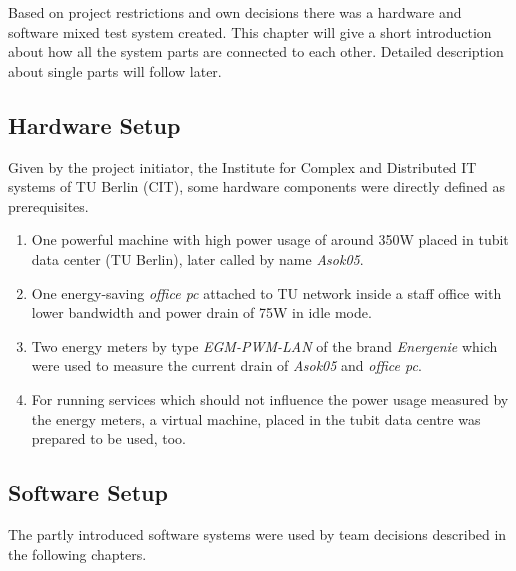 Based on project restrictions and own decisions there was a hardware and software mixed test system created. This chapter will give a short introduction about how all the system parts are connected to each other. Detailed description about single parts will follow later.

\subsection{Hardware Setup}

Given by the project initiator, the Institute for Complex and Distributed IT systems of TU Berlin (CIT), some hardware components were directly defined as prerequisites.

\begin{enumerate}

\item One powerful machine with high power usage of around 350W placed in tubit data center (TU Berlin), later called by name \textit{Asok05}.

\item One energy-saving \textit{office pc} attached to TU network inside a staff office with lower bandwidth and power drain of 75W in idle mode.

\item Two energy meters by type \textit{EGM-PWM-LAN} of the brand \textit{Energenie} which were used to measure the current drain of \textit{Asok05} and \textit{office pc}.

\item For running services which should not influence the power usage measured by the energy meters, a virtual machine, placed in the tubit data centre was prepared to be used, too.

\end{enumerate}


\subsection{Software Setup}

The partly introduced software systems were used by team decisions described in the following chapters.

